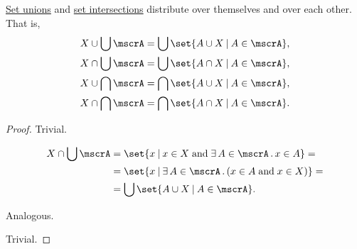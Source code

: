 \begin{proposition}\label{thm:union_intersection_distributivity}
  \hyperref[def:basic_set_operations/union]{Set unions} and \hyperref[def:basic_set_operations/intersection]{set intersections} distribute over themselves and over each other. That is,
  \begin{align}
    X \cup \bigcup \mscrA &= \bigcup \set{ A \cup X \given A \in \mscrA }, \label{eq:thm:union_intersection_distributivity/union_over_union} \\
    X \cap \bigcup \mscrA &= \bigcup \set{ A \cap X \given A \in \mscrA }, \label{eq:thm:union_intersection_distributivity/intersection_over_union} \\
    X \cup \bigcap \mscrA &= \bigcap \set{ A \cup X \given A \in \mscrA }, \label{eq:thm:union_intersection_distributivity/union_over_intersection} \\
    X \cap \bigcap \mscrA &= \bigcap \set{ A \cap X \given A \in \mscrA }. \label{eq:thm:union_intersection_distributivity/intersection_over_intersection}
  \end{align}
\end{proposition}
\begin{proof}
   Trivial.

  \begin{align*}
    X \cap \bigcup \mscrA
    &=
    \set{ x \given x \in X \T{and} \qexists{A \in \mscrA} x \in A }
    = \\ &=
    \set{ x \given \qexists{A \in \mscrA} (x \in A \T{and} x \in X) }
    = \\ &=
    \bigcup \set{ A \cup X \given A \in \mscrA }.
  \end{align*}

   Analogous.

   Trivial.
\end{proof}

